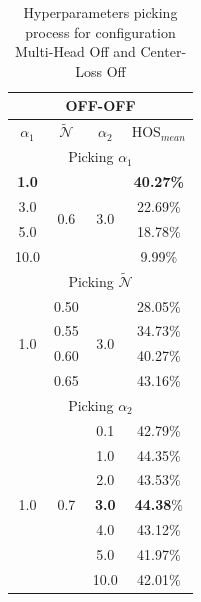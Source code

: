 \documentclass[10pt,twocolumn,letterpaper]{article}
\begin{document}
\begin{table}
  \centering
  \begin{tabular}[h]{||c|c|c||c||}
    \hline
    \multicolumn{4}{||c||}{OFF-OFF} \\
    \hline
    $\alpha_1$ & $\mathcal{\tilde N}$ & $\alpha_2$ & HOS$_{mean}$\\    
    \hline
    \hline
    \multicolumn{4}{||c||}{Picking $\alpha_1$} \\
    \hline
    {\bf 1.0}  & \multirow{4}{*}{0.6} & \multirow{4}{*}{3.0} & {\bf 40.27\%} \\
    3.0  & & & 22.69\% \\
    5.0  & & & 18.78\% \\
    10.0 & & & 9.99\% \\
    \hline
    \hline
    \multicolumn{4}{||c||}{Picking $\mathcal{\tilde N}$} \\
    \hline
    \multirow{4}{*}{1.0} & 0.50 & \multirow{4}{*}{3.0}  & 28.05\%\\
    & 0.55 & & 34.73\% \\
    & 0.60 & & 40.27\% \\
    & 0.65 & & 43.16\% \\
    \hline
    \hline
    \multicolumn{4}{||c||}{Picking $\alpha_2$} \\
    \hline
    \multirow{7}{*}{1.0} & \multirow{7}{*}{0.7} & 0.1 & 42.79\%\\
    && 1.0 & 44.35\% \\
    && 2.0 & 43.53\% \\
    && {\bf 3.0} & {\bf 44.38}\% \\
    && 4.0 & 43.12\% \\
    && 5.0 & 41.97\% \\
    && 10.0 & 42.01\% \\
    \hline
  \end{tabular}
  \caption{\centering\label{tab:ablationoffoff} Hyperparameters picking process for configuration Multi-Head Off and Center-Loss Off}
\end{table}
\end{document}
